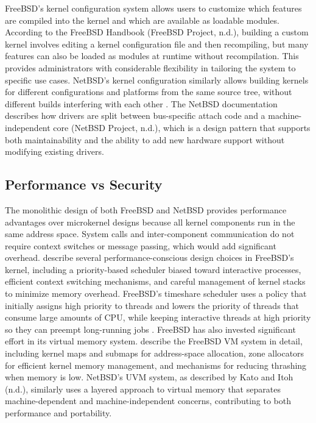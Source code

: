 FreeBSD's kernel configuration system allows users to customize which features are compiled into the kernel and which are available as loadable modules. According to the FreeBSD Handbook (FreeBSD Project, n.d.), building a custom kernel involves editing a kernel configuration file and then recompiling, but many features can also be loaded as modules at runtime without recompilation. This provides administrators with considerable flexibility in tailoring the system to specific use cases.
NetBSD's kernel configuration similarly allows building kernels for different configurations and platforms from the same source tree, without different builds interfering with each other \parencite{feyrer2002}. The NetBSD documentation describes how drivers are split between bus-specific attach code and a machine-independent core (NetBSD Project, n.d.), which is a design pattern that supports both maintainability and the ability to add new hardware support without modifying existing drivers.

\subsection{Performance vs Security}
The monolithic design of both FreeBSD and NetBSD provides performance advantages over microkernel designs because all kernel components run in the same address space. System calls and inter-component communication do not require context switches or message passing, which would add significant overhead. \textcite{watson2015} describe several performance-conscious design choices in FreeBSD's kernel, including a priority-based scheduler biased toward interactive processes, efficient context switching mechanisms, and careful management of kernel stacks to minimize memory overhead. FreeBSD's timeshare scheduler uses a policy that initially assigns high priority to threads and lowers the priority of threads that consume large amounts of CPU, while keeping interactive threads at high priority so they can preempt long-running jobs \parencite{watson2015}.
FreeBSD has also invested significant effort in its virtual memory system. \textcite{watson2015} describe the FreeBSD VM system in detail, including kernel maps and submaps for address-space allocation, zone allocators for efficient kernel memory management, and mechanisms for reducing thrashing when memory is low. NetBSD's UVM system, as described by Kato and Itoh (n.d.), similarly uses a layered approach to virtual memory that separates machine-dependent and machine-independent concerns, contributing to both performance and portability.

